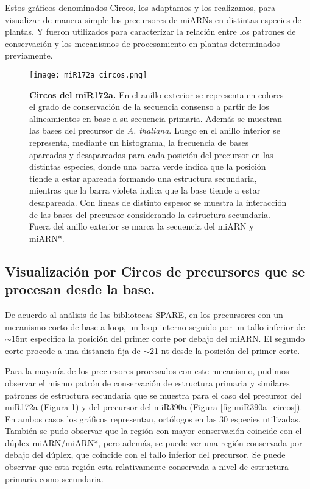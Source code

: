 Estos gráficos denominados Circos, los adaptamos y los realizamos, para visualizar de manera simple los precursores de miARNs en distintas especies de plantas.
Y fueron utilizados para caracterizar la relación entre los patrones de conservación y los mecanismos de procesamiento en plantas determinados previamente.


\begin{figure}[htbp!] 
    \centering    
    \texttt{[image: miR172a\_circos.png]}
    \caption[Circos del miR172a]{
    \textbf{Circos del miR172a.}
En el anillo exterior se representa en colores el grado de conservación de la secuencia consenso a partir de los alineamientos en base a su secuencia primaria.
Además se muestran las bases del precursor de \textit {A. thaliana}.
Luego en el anillo interior se representa, mediante un histograma, la frecuencia de bases apareadas y desapareadas para cada posición del precursor en las distintas especies, donde una barra verde indica que la posición tiende a estar apareada formando una estructura secundaria, mientras que la barra violeta indica que la base tiende a estar desapareada. 
Con líneas de distinto espesor se muestra la interacción de las bases del precursor considerando la estructura secundaria. 
Fuera del anillo exterior se marca la secuencia del miARN y miARN*.
   }
     \label{fig:miR172a_circos}
\end{figure}


\subsection{Visualización por Circos de precursores que se procesan desde la base.}

De acuerdo al análisis de las bibliotecas SPARE, en los precursores con un mecanismo corto de base a loop, un loop interno seguido por un tallo inferior de $\sim$15nt especifica la posición del primer corte por debajo del miARN.
El segundo corte procede a una distancia fija de $\sim$21 nt desde la posición del primer corte.

Para la mayoría de los precursores procesados con este mecanismo, pudimos observar el mismo patrón de conservación de estructura primaria y similares patrones de estructura secundaria que se muestra para el caso del precursor del miR172a (Figura \ref{fig:miR172a_circos}) y del precursor del miR390a (Figura \ref{fig:miR390a_circos}).
En ambos casos los gráficos representan, ortólogos en las 30 especies utilizadas.
También se pudo observar que la región con mayor conservación coincide con el dúplex miARN/miARN*, pero además, se puede ver una región conservada por debajo del dúplex, que coincide con el tallo inferior del precursor.
Se puede observar que esta región esta relativamente conservada a nivel de estructura primaria como secundaria.

